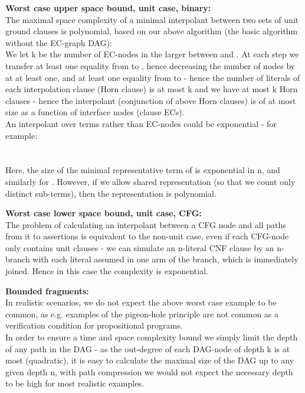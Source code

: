 \textbf{Worst case upper space bound, unit case, binary:}\\
The maximal space complexity of a minimal interpolant between two sets of unit ground clauses is polynomial, based on our above algorithm (the basic algorithm without the EC-graph DAG):\\
We let k be the number of EC-nodes in the larger between  and . At each step we transfer at least one equality from  to , hence decreasing the number of nodes by at at least one, and at least one equality from  to  - hence the number of literals of each interpolation clause (Horn clause) is at most k and we have at most k Horn clauses - hence the interpolant (conjunction of above Horn clauses) is of at most  size as a function of interface nodes (clause ECs).\\
An interpolant over terms rather than EC-nodes could be exponential - for example:\\
\\
\\
Here, the size of the minimal representative term of  is exponential in n, 
and similarly for . However, if we allow shared representation (so that we count only distinct sub-terms), then the representation is polynomial.

\textbf{Worst case lower space bound, unit case, CFG:}\\
The problem of calculating an interpolant between a CFG node and all paths from it to assertions is equivalent to the non-unit case,
even if each CFG-node only contains unit clauses - we can simulate an n-literal CNF clause by an n-branch with each literal assumed in one arm of the branch, which is immediately joined. Hence in this case the complexity is exponential.

\textbf{Bounded fragments:}\\
In realistic scenarios, we do not expect the above worst case example to be common, as e.g. examples of the pigeon-hole principle are not common as a verification condition for propositional programs.\\
In order to ensure a time and space complexity bound we simply limit the depth of any path in the DAG - as the out-degree of each DAG-node of depth k is at most  (quadratic), it is easy to calculate the maximal size of the DAG up to any given depth n, 
with path compression we would not expect the necessary depth to be high for most realistic examples.

